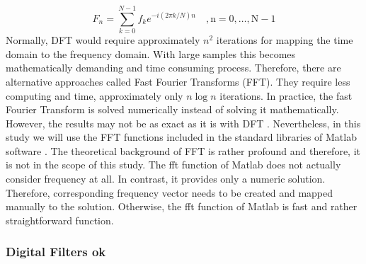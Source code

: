 \documentclass[english,12pt,a4paper,pdftex,elec,utf8]{aaltothesis}
\begin{document}
\begin{equation} \label{fftequation}
F_n =  \sum \limits^{N-1}_{k=0} f_k e^{-i(2\pi k / N) n} \mathrm{\hspace{1em} , n = 0, \dots , N -1} 
\end{equation} 
Normally, DFT would require approximately $n^2$ iterations for mapping the time domain to the frequency domain. With large samples this becomes mathematically demanding and time consuming process. Therefore, there are alternative approaches called Fast Fourier Transforms (FFT). They require less computing and time, approximately only $n \log n$ iterations. In practice, the fast Fourier Transform is solved numerically instead of solving it mathematically. However, the results may not be as exact as it is with DFT \cite{khan2005digital} \cite{rao2012fast}. Nevertheless, in this study we will use the FFT functions included in the standard libraries of Matlab software \cite{matlabfft}. The theoretical background of FFT is rather profound and therefore, it is not in the scope of this study. The fft function of Matlab does not actually consider frequency at all. In contrast, it provides only a numeric solution. Therefore, corresponding frequency vector needs to be created and mapped manually to the solution. Otherwise, the fft function of Matlab is fast and rather straightforward function.





\subsubsection{Digital Filters ok} \label{digitalfilterssection}
\end{document}

